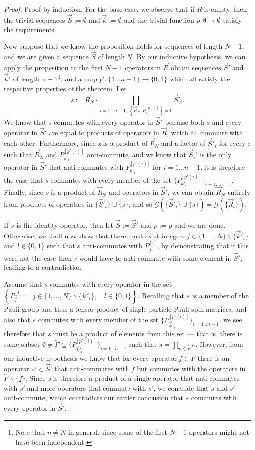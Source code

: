 \documentclass{amsbook}
\theoremstyle{plain}
\theoremstyle{definition}
\theoremstyle{remark}
\newcommand{\lst}{\vec}
\newcommand{\set}{\tilde}
\newcommand{\genfun}{\tilde{\mathcal{G}}}
\newcommand{\paren}[1]{\left(#1\right)}
\begin{document}
\begin{proof}
Proof by induction.  For the base case, we observe that if $\lst R$ is empty, then the trivial sequences $\lst S:=\emptyset$ and $\lst k :=\emptyset$ and the trivial function $p:\emptyset\to\emptyset$ satisfy the requirements.

Now suppose that we know the proposition holds for sequences of length $N-1$, and we are given a sequence $\lst S$ of length $N$.  By our inductive hypothesis, we can apply the proposition to the first $N-1$ operators in $\lst R$ obtain sequences $\lst S'$ and $\lst k'$ of length $n-1$\footnote{Note that $n\ne N$ in general, since some of the first $N-1$ operators might not have been independent.}, and a map $p':\{1\dots n-1\}\to \{0,1\}$ which all satisfy the respective properties of the theorem.  Let $$s:=\lst R_N\cdot \prod_{i=1\dots n-1, \,\,\left\{\lst R_N,P_{k'_i}^{[p(i)]}\right\}=0} \lst S'_i.$$  We know that $s$ commutes with every operator in $\lst S'$ because both $s$ and every operator in $\lst S'$ are equal to products of operators in $\lst R$, which all commute with each other.  Furthermore, since $s$ is a product of $\lst R_N$ and a factor of $\lst S'_i$ for every $i$ such that $\lst R_N$ and $P_{k'_i}^{[p'(i)]}$ anti-commute, and we know that $\lst S_i'$ is the only operator in $\lst S'$ that anti-commutes with $P_{k'_i}^{[p'(i)]}$ for $i=1\dots n-1$, it is therefore the case that $s$ commutes with every member of the set $\{P_{k'_i}^{[p'(i)]}\}_{i=1\dots n-1}$.  Finally, since $s$ is a product of $\lst R_N$ and operators in $\lst S'$, we can obtain $\lst R_N$ entirely from products of operators in $\{\lst S'_i\} \cup \{s\}$, and so $\genfun\paren{\{\lst S'_i\} \cup \{s\}}=\genfun\paren{\{\lst R_i\}}$.

If $s$ is the identity operator, then let $\lst S:=\lst S'$ and $p:=p$ and we are done.  Otherwise, we shall now show that there must exist integers $j\in\{1,\dots,N\}\backslash\{\lst k'_i\}$ and $l\in\{0,1\}$ such that $s$ anti-commutes with $P_{j}^{[l]}$, by demonstrating that if this were not the case then $s$ would have to anti-commute with some element in $\lst S'$, leading to a contradiction.

Assume that $s$ commutes with every operator in the set $\left\{P_j^{[l]}:\quad j\in\{1,\dots,N\}\backslash\{\lst k'_i\}, \quad l\in\{0,1\}\right\}.$  Recalling that $s$ is a member of the Pauli group and thus a tensor product of single-particle Pauli spin matrices, and also that $s$ commutes with every member of the set $\{P_{\lst k'_i}^{[p'(i)]}\}_{i=1\dots n-1}$, we see therefore that $s$ must be a product of elements from this set --- that is, there is some subset $\emptyset \ne \set F \subseteq \{P_{\lst k'_i}^{[p'(i)]}\}_{i=1\dots n-1}$ such that $s=\prod_{o\in \set F} o$.  However, from our inductive hypothesis we know that for every operator $f\in\set F$ there is an operator $s'\in\lst S'$ that anti-commutes with $f$ but commutes with the operators in $\set F\backslash\{f\}$.  Since $s$ is therefore a product of a single operator that anti-commutes with $s'$ and more operators that commute with $s'$, we conclude that $s$ and $s'$ anti-commute, which contradicts our earlier conclusion that $s$ commutes with every operator in $\lst S'$.


\end{proof}
\end{document}
